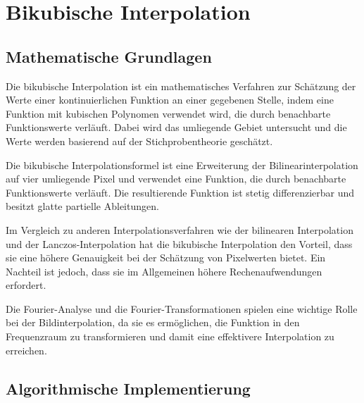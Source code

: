 \section{Bikubische Interpolation}

\subsection{Mathematische Grundlagen}


    
Die bikubische Interpolation ist ein mathematisches Verfahren zur Schätzung der Werte einer kontinuierlichen Funktion an einer gegebenen Stelle, indem eine Funktion mit kubischen Polynomen verwendet wird, die durch benachbarte Funktionswerte verläuft. Dabei wird das umliegende Gebiet untersucht und die Werte werden basierend auf der Stichprobentheorie geschätzt.

Die bikubische Interpolationsformel ist eine Erweiterung der Bilinearinterpolation auf vier umliegende Pixel und verwendet eine Funktion, die durch benachbarte Funktionswerte verläuft. Die resultierende Funktion ist stetig differenzierbar und besitzt glatte partielle Ableitungen.

Im Vergleich zu anderen Interpolationsverfahren wie der bilinearen Interpolation und der Lanczos-Interpolation hat die bikubische Interpolation den Vorteil, dass sie eine höhere Genauigkeit bei der Schätzung von Pixelwerten bietet. Ein Nachteil ist jedoch, dass sie im Allgemeinen höhere Rechenaufwendungen erfordert.

Die Fourier-Analyse und die Fourier-Transformationen spielen eine wichtige Rolle bei der Bildinterpolation, da sie es ermöglichen, die Funktion in den Frequenzraum zu transformieren und damit eine effektivere Interpolation zu erreichen.

\subsection{Algorithmische Implementierung}


